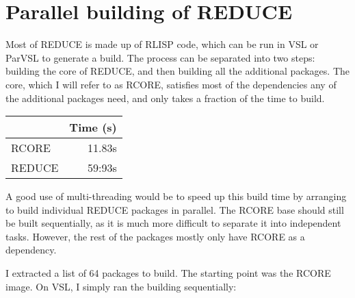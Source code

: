 
\section{Parallel building of REDUCE}

Most of REDUCE is made up of RLISP code, which can be run in VSL or ParVSL
to generate a build. The process can be separated into two steps:
building the core of REDUCE, and then building all the additional packages.
The core, which I will refer to as RCORE, satisfies most of the dependencies
any of the additional packages need, and only takes a fraction of the time
to build.

\begin{table}[H]
\centering
\begin{tabular}{lr}
 & Time (s)\\
\hline
RCORE & 11.83s\\
REDUCE & 59:93s\\
\end{tabular}
\end{table}

A good use of multi-threading would be to speed up this build time by
arranging to build individual REDUCE packages in parallel. The RCORE base
should still be built sequentially, as it is much more difficult to
separate it into independent tasks. However, the rest of the packages mostly
only have RCORE as a dependency.

I extracted a list of 64 packages to build. The starting point was the
RCORE image. On VSL, I simply ran the building sequentially:

